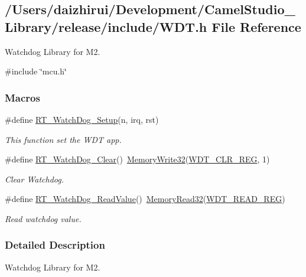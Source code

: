 \hypertarget{a00059}{}\subsection{/\+Users/daizhirui/\+Development/\+Camel\+Studio\+\_\+\+Library/release/include/\+W\+DT.h File Reference}
\label{a00059}


Watchdog Library for M2.  


{\ttfamily \#include \char`\"{}mcu.\+h\char`\"{}}\newline
\subsubsection*{Macros}
\begin{DoxyCompactItemize}
\item 
\#define \mbox{\hyperlink{a00059_a369b51538a0ccf57dcdb30e12352a8c7}{R\+T\+\_\+\+Watch\+Dog\+\_\+\+Setup}}(n,  irq,  rst)
\begin{DoxyCompactList}\small\item\em This function set the W\+DT app. \end{DoxyCompactList}\item 
\#define \mbox{\hyperlink{a00059_ae976b2fe76d4b216e68a771068434abc}{R\+T\+\_\+\+Watch\+Dog\+\_\+\+Clear}}()~\mbox{\hyperlink{a00020_a6b9732365b12e48ddb89fe1028b975b0}{Memory\+Write32}}(\mbox{\hyperlink{a00020_a2560b8d7465c0ee0112852677004099f}{W\+D\+T\+\_\+\+C\+L\+R\+\_\+\+R\+EG}}, 1)
\begin{DoxyCompactList}\small\item\em Clear Watchdog. \end{DoxyCompactList}\item 
\#define \mbox{\hyperlink{a00059_acdfc8b8f0bddfd7382d49a22a92a5930}{R\+T\+\_\+\+Watch\+Dog\+\_\+\+Read\+Value}}()~\mbox{\hyperlink{a00020_a2d484dc15bdf30ee11ab3b05f31f0e16}{Memory\+Read32}}(\mbox{\hyperlink{a00020_ab04902f3d750cf4826ded8350ad5adac}{W\+D\+T\+\_\+\+R\+E\+A\+D\+\_\+\+R\+EG}})
\begin{DoxyCompactList}\small\item\em Read watchdog value. \end{DoxyCompactList}\end{DoxyCompactItemize}


\subsubsection{Detailed Description}
Watchdog Library for M2. 

